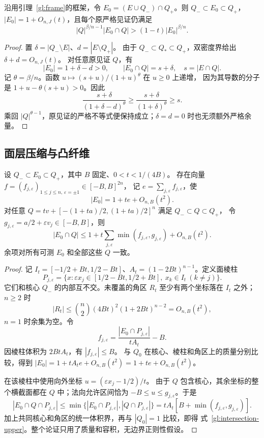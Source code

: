 \begin{lemma}[填补共同核与截去外部质量]\label{gl:mass-modification}
沿用引理~\ref{gl:frame}的框架，令
$E_0=(E\cup Q_-)\cap Q_+$。则 $Q_-\subset E_0\subset Q_+$，
$|E_0|=1+O_{n,J}(t)$，且每个原严格见证仍满足
\[
 |Q|^{\beta/n-1}|E_0\cap Q|>(1-t)|E_0|^{\beta/n}.
\]
\end{lemma}
\begin{proof}
置 $\delta=|Q_-\setminus E|$、$d=|E\setminus Q_+|$。
由于 $Q_-\subset Q_*\subset Q_+$，双密度界给出 $\delta+d=O_{n,J}(t)$。
对任意原见证 $Q$，有
\[
 |E_0|=1+\delta-d>0,\qquad |E_0\cap Q|=s+\delta,\quad s=|E\cap Q|.
\]
记 $\theta=\beta/n$。函数 $u\mapsto(s+u)/(1+u)^\theta$ 在 $u\ge0$ 上递增，
因为其导数的分子是 $1+u-\theta(s+u)>0$。因此
\[
 \frac{s+\delta}{(1+\delta-d)^\theta}
 \ge\frac{s+\delta}{(1+\delta)^\theta}\ge s.
\]
乘回 $|Q|^{\theta-1}$，原见证的严格不等式便保持成立；$\delta=d=0$ 时也无须额外严格余量。
\end{proof}

\subsection{面层压缩与凸纤维}

\begin{lemma}[任意可测面层的统一上压缩]\label{gl:face-compression}
设 $Q_-\subset E_0\subset Q_+$，其中 $B$ 固定、$0<t<1/(4B)$。
存在向量 $f=(f_{j,\varepsilon})_{1\le j\le n,\,\varepsilon=\pm1}\in[-B,B]^{2n}$，
记 $e=\sum_{j,\varepsilon}f_{j,\varepsilon}$，使
\[
 |E_0|=1+te+O_{n,B}(t^2).
\]
对任意 $Q=tv+[-(1+ta)/2,(1+ta)/2]^n$ 满足 $Q_-\subset Q\subset Q_+$，
令 $g_{j,\varepsilon}=a/2+\varepsilon v_j\in[-B,B]$，则
\begin{equation}\label{gl:intersection-upper}
 |E_0\cap Q|\le1+t\sum_{j,\varepsilon}\min(f_{j,\varepsilon},g_{j,\varepsilon})
                  +O_{n,B}(t^2).
\end{equation}
余项对所有可测 $E_0$ 和全部这些 $Q$ 一致。
\end{lemma}
\begin{proof}
记 $I_t=[-1/2+Bt,1/2-Bt]$、$A_t=(1-2Bt)^{n-1}$。定义面棱柱
\[
 P_{j,\varepsilon}=\{x:\varepsilon x_j\in[1/2-Bt,1/2+Bt],\ x_k\in I_t\ (k\ne j)\}.
\]
它们和核心 $Q_-$ 的内部互不交。未覆盖的角区 $R_t$ 至少有两个坐标落在
$I_t$ 之外；$n\ge2$ 时
\[
 |R_t|\le\binom n2(4Bt)^2(1+2Bt)^{n-2}=O_{n,B}(t^2),
\]
$n=1$ 时余集为空。令
\[
 f_{j,\varepsilon}=\frac{|E_0\cap P_{j,\varepsilon}|}{tA_t}-B.
\]
因棱柱体积为 $2BtA_t$，有 $|f_{j,\varepsilon}|\le B$。
与 $Q_0$ 在核心、棱柱和角区上的质量分别比较，得到
$|E_0|=1+tA_te+O_{n,B}(t^2)=1+te+O_{n,B}(t^2)$。

在该棱柱中使用向外坐标 $u=(\varepsilon x_j-1/2)/t$。
由于 $Q$ 包含核心，其余坐标的整个横截面都在 $Q$ 中；法向允许区间恰为
$-B\le u\le g_{j,\varepsilon}$。于是
\[
 |E_0\cap Q\cap P_{j,\varepsilon}|
 \le\min\{|E_0\cap P_{j,\varepsilon}|,|Q\cap P_{j,\varepsilon}|\}
 =tA_t[B+\min(f_{j,\varepsilon},g_{j,\varepsilon})].
\]
加上共同核心和角区的统一体积界，再与 $|Q_0|=1$ 比较，即得
式~\eqref{gl:intersection-upper}。整个论证只用了质量和容积，无边界正则性假设。
\end{proof}

